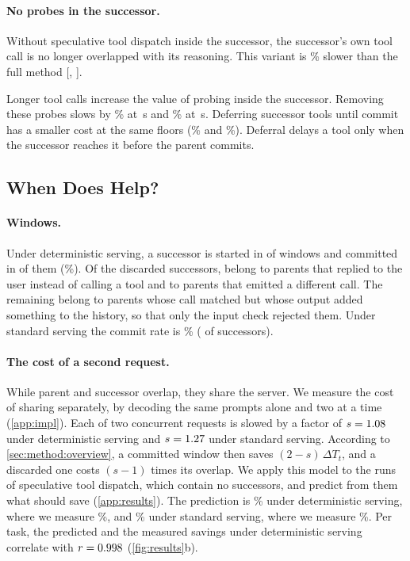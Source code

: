 \paragraph{No probes in the successor.}
Without speculative tool dispatch inside the successor, the successor's own tool call is no longer overlapped with its reasoning.
This variant is \AblSlowerNoProbe\% slower than the full method [\AblSlowerNoProbeLo, \AblSlowerNoProbeHi].

Longer tool calls increase the value of probing inside the successor. Removing these probes slows \method by \ToolMidNoProbe\% at \ToolMidFloor\,s and \ToolHighNoProbe\% at \ToolHighFloor\,s. Deferring successor tools until commit has a smaller cost at the same floors (\ToolMidDefer\% and \ToolHighDefer\%). Deferral delays a tool only when the successor reaches it before the parent commits.

\subsection{When Does \method Help?}
\label{sec:exp:analysis}

\paragraph{Windows.}
Under deterministic serving, a successor is started in \WinDetStarted{} of \WinDetWindows{} windows and committed in \WinDetCommitted{} of them (\WinDetCommitPct\%).
Of the \WinDetDiscarded{} discarded successors, \WinDetRejReply{} belong to parents that replied to the user instead of calling a tool and \WinDetRejCall{} to parents that emitted a different call.
The remaining \WinDetRejInput{} belong to parents whose call matched but whose output added something to the history, so that only the input check rejected them.
Under standard serving the commit rate is \WinStdCommitPct\% (\WinStdCommitted{} of \WinStdStarted{} successors).

\paragraph{The cost of a second request.}
While parent and successor overlap, they share the server.
We measure the cost of sharing separately, by decoding the same prompts alone and two at a time (\cref{app:impl}).
Each of two concurrent requests is slowed by a factor of $s=1.08$ under deterministic serving and $s=1.27$ under standard serving.
According to \cref{sec:method:overview}, a committed window then saves $(2-s)\,\Delta T_t$, and a discarded one costs $(s-1)$ times its overlap.
We apply this model to the runs of speculative tool dispatch, which contain no successors, and predict from them what \method should save (\cref{app:results}).
The prediction is \CostDetPred\% under deterministic serving, where we measure \CostDetMeasured\%, and \CostStdPred\% under standard serving, where we measure \CostStdMeasured\%.
Per task, the predicted and the measured savings under deterministic serving correlate with $r=0.998$ (\cref{fig:results}b).

